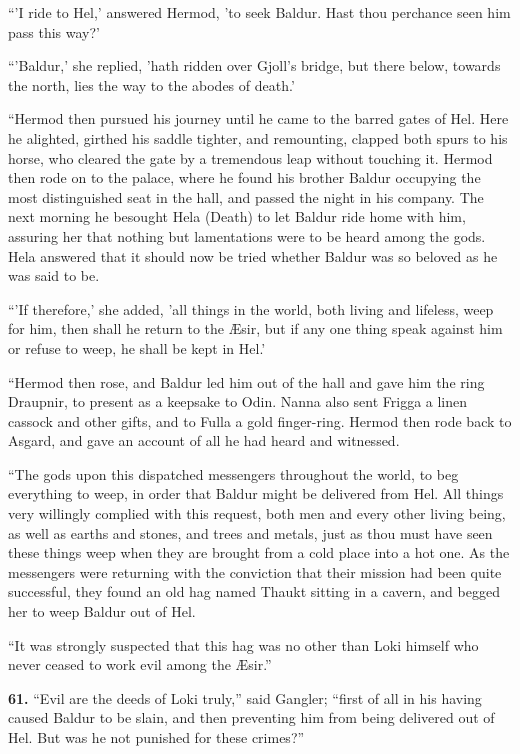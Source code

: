 ``'I ride to Hel,' answered Hermod, 'to seek Baldur. Hast thou
perchance seen him pass this way?'

``'Baldur,' she replied, 'hath ridden over Gjoll's bridge, but there
below, towards the north, lies the way to the abodes of death.'

``Hermod then pursued his journey until he came to the barred gates of
Hel. Here he alighted, girthed his saddle tighter, and remounting,
clapped both spurs to his horse, who cleared the gate by a tremendous
leap without touching it. Hermod then rode on to the palace, where he
found his brother Baldur occupying the most distinguished seat in the
hall, and passed the night in his company. The next morning he
besought Hela (Death) to let Baldur ride home with him, assuring her
that nothing but lamentations were to be heard among the gods. Hela
answered that it should now be tried whether Baldur was so beloved as
he was said to be.

``'If therefore,' she added, 'all things in the world, both living and
lifeless, weep for him, then shall he return to the Æsir, but if any
one thing speak against him or refuse to weep, he shall be kept in
Hel.'

``Hermod then rose, and Baldur led him out of the hall and gave him the
ring Draupnir, to present as a keepsake to Odin. Nanna also sent
Frigga a linen cassock and other gifts, and to Fulla a gold
finger-ring. Hermod then rode back to Asgard, and gave an account of
all he had heard and witnessed.

``The gods upon this dispatched messengers throughout the world, to beg
everything to weep, in order that Baldur might be delivered from Hel.
All things very willingly complied with this request, both men and
every other living being, as well as earths and stones, and trees and
metals, just as thou must have seen these things weep when they are
brought from a cold place into a hot one. As the messengers were
returning with the conviction that their mission had been quite
successful, they found an old hag named Thaukt sitting in a cavern,
and begged her to weep Baldur out of Hel.

``It was strongly suspected that this hag was no other than Loki
himself who never ceased to work evil among the Æsir.''


\textbf{61.} ``Evil are the deeds of Loki truly,'' said Gangler; ``first of all
in his having caused Baldur to be slain, and then preventing him from
being delivered out of Hel. But was he not punished for these crimes?''

